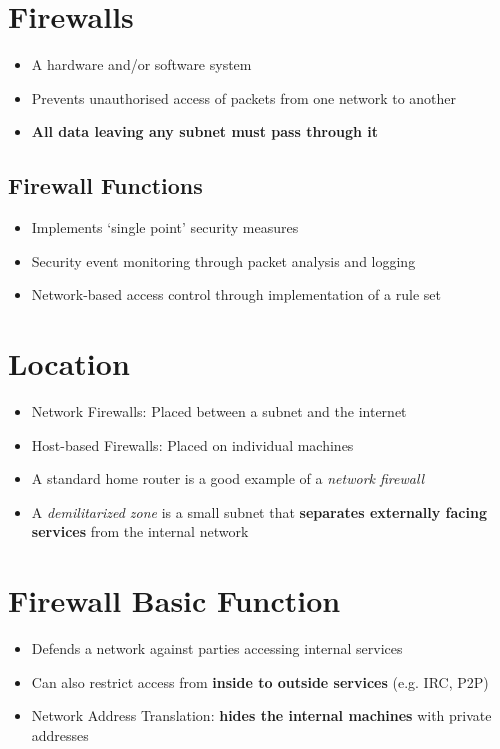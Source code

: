 \documentclass{article}
\begin{document}
\tableofcontents

\newpage

\section{Firewalls}
\begin{itemize}
  \item A hardware and/or software system 
  \item Prevents unauthorised access of packets from one network to another 
  \item \textbf{All data leaving any subnet must pass through it}
\end{itemize}

\subsection{Firewall Functions}
\begin{itemize}
  \item Implements ‘single point’ security measures 
  \item Security event monitoring through packet analysis and logging 
  \item Network-based access control through implementation of a rule set
\end{itemize}

\section{Location}  
\begin{itemize}
  \item Network Firewalls: Placed between a subnet and the internet  
  \item Host-based Firewalls: Placed on individual machines
  \item A standard home router is a good example of a \textit{network firewall}
  \item A \textit{demilitarized zone} is a small subnet that\textbf{ separates externally facing
services} from the internal network
\end{itemize}

\section{Firewall Basic Function}
\begin{itemize}
  \item Defends a network against parties accessing internal services 
  \item Can also restrict access from \textbf{inside to outside services} (e.g. IRC, P2P) 
  \item Network Address Translation: \textbf{hides the internal machines} with private addresses
\end{itemize}
\end{document}
